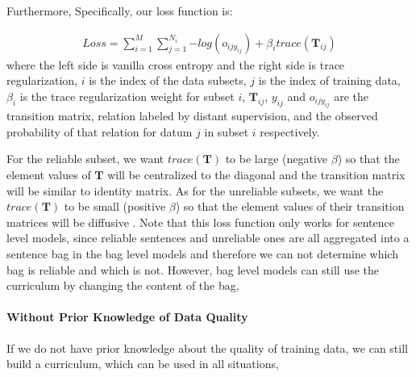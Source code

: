 Furthermore, 
Specifically, our loss function is:

\begin{equation}
\begin{aligned}
Loss=\sum_{i=1}^M{\sum_{j=1}^{N_i}{-log(o_{ijy_{ij}})}} + \beta_i trace(\mathbf{T}_{ij})
\end{aligned}
\end{equation}
where the left side is vanilla cross entropy and the right side is trace regularization, $i$ is the index of the data subsets, $j$ is the index of training data, $\beta_i$ is the trace regularization weight for subset $i$, $\mathbf{T}_{ij}$, $y_{ij}$ and $o_{ijy_{ij}}$ are the transition matrix, relation labeled by distant supervision, and the observed probability of that relation for datum $j$ in subset $i$ respectively.

For the reliable subset, we want $trace(\mathbf{T})$ to be large (negative $\beta$) so that the element values of $\mathbf{T}$ will be centralized to the diagonal and the transition matrix will be similar to identity matrix. As for the unreliable subsets, we want the $trace(\mathbf{T})$ to be small (positive $\beta$) so that the element values of their transition matrices will be diffusive . Note that this loss function only works for sentence level models, since reliable sentences and unreliable ones are all aggregated into a sentence bag in the bag level models and therefore we can not determine which bag is reliable and which is not. However, bag level models can still use the curriculum by changing the content of the bag,  

\paragraph{Without Prior Knowledge of Data Quality}
\label{curr_over_data}
If we do not have prior knowledge about the quality of training data, we can still build a curriculum, which can be used in all situations, 

